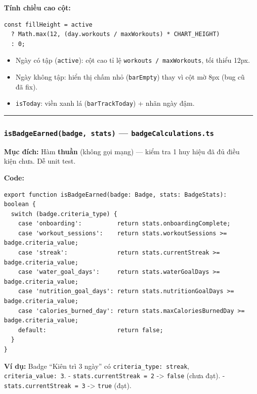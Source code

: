 \documentclass[12pt,a4paper]{article}
\providecommand{\tightlist}{%
  \setlength{\itemsep}{0pt}\setlength{\parskip}{0pt}}
\begin{document}
\textbf{Tính chiều cao cột:}

\begin{verbatim}
const fillHeight = active
  ? Math.max(12, (day.workouts / maxWorkouts) * CHART_HEIGHT)
  : 0;

\end{verbatim}

\begin{itemize}
\tightlist
\item
  Ngày có tập (\texttt{active}): cột cao tỉ lệ
  \texttt{workouts\ /\ maxWorkouts}, tối thiểu 12px.
\item
  Ngày không tập: hiển thị chấm nhỏ (\texttt{barEmpty}) thay vì cột mờ
  8px (bug cũ đã fix).
\item
  \texttt{isToday}: viền xanh lá (\texttt{barTrackToday}) + nhãn ngày
  đậm.
\end{itemize}

\begin{center}\rule{0.5\linewidth}{0.5pt}\end{center}

\subsubsection{\texorpdfstring{\texttt{isBadgeEarned(badge,\ stats)} ---
\texttt{badgeCalculations.ts}}{isBadgeEarned(badge, stats) --- badgeCalculations.ts}}\label{isbadgeearnedbadge-stats-badgecalculations.ts}

\textbf{Mục đích:} Hàm \textbf{thuần} (không gọi mạng) --- kiểm tra 1
huy hiệu đã đủ điều kiện chưa. Dễ unit test.

\textbf{Code:}

\begin{verbatim}
export function isBadgeEarned(badge: Badge, stats: BadgeStats): boolean {
  switch (badge.criteria_type) {
    case 'onboarding':          return stats.onboardingComplete;
    case 'workout_sessions':    return stats.workoutSessions >= badge.criteria_value;
    case 'streak':              return stats.currentStreak >= badge.criteria_value;
    case 'water_goal_days':     return stats.waterGoalDays >= badge.criteria_value;
    case 'nutrition_goal_days': return stats.nutritionGoalDays >= badge.criteria_value;
    case 'calories_burned_day': return stats.maxCaloriesBurnedDay >= badge.criteria_value;
    default:                    return false;
  }
}

\end{verbatim}

\textbf{Ví dụ:} Badge ``Kiên trì 3 ngày'' có
\texttt{criteria\_type:\ \textquotesingle{}streak\textquotesingle{}},
\texttt{criteria\_value:\ 3}. - \texttt{stats.currentStreak\ =\ 2}
-\textgreater{} \texttt{false} (chưa đạt). -
\texttt{stats.currentStreak\ =\ 3} -\textgreater{} \texttt{true} (đạt).
\end{document}

